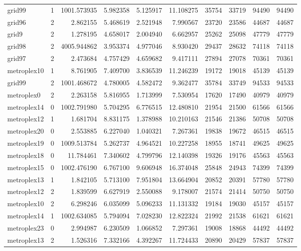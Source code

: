 \begin{longtable}{|l|r|r|r|r|r|r|r|r|r|}
grid99 & 1 & 1001.573935 & 5.982358 & 5.125917 & 11.108275 & 35754 & 33719 & 94490 & 94490 \\
grid96 & 2 & 2.862155 & 5.468619 & 2.521948 & 7.990567 & 23720 & 23586 & 44687 & 44687 \\
grid9 & 2 & 1.278195 & 4.658017 & 2.004940 & 6.662957 & 25262 & 25098 & 47779 & 47779 \\
grid98 & 2 & 4005.944862 & 3.953374 & 4.977046 & 8.930420 & 29437 & 28632 & 74118 & 74118 \\
grid97 & 2 & 2.473684 & 4.757429 & 4.659682 & 9.417111 & 27894 & 27078 & 70361 & 70361 \\
metroplex10 & 1 & 8.761905 & 7.409700 & 3.836539 & 11.246239 & 19172 & 19018 & 45139 & 45139 \\
grid99 & 2 & 1001.468672 & 4.780005 & 4.582472 & 9.362477 & 35784 & 33749 & 94533 & 94533 \\
metroplex0 & 2 & 2.263158 & 5.816955 & 1.713999 & 7.530954 & 17620 & 17490 & 40979 & 40979 \\
metroplex14 & 0 & 1002.791980 & 5.704295 & 6.776515 & 12.480810 & 21954 & 21500 & 61566 & 61566 \\
metroplex12 & 1 & 1.681704 & 8.831175 & 1.378988 & 10.210163 & 21546 & 21386 & 50708 & 50708 \\
metroplex20 & 0 & 2.553885 & 6.227040 & 1.040321 & 7.267361 & 19838 & 19672 & 46515 & 46515 \\
metroplex19 & 0 & 1009.513784 & 5.262737 & 4.964521 & 10.227258 & 18955 & 18741 & 49625 & 49625 \\
metroplex18 & 0 & 11.784461 & 7.340602 & 4.799796 & 12.140398 & 19326 & 19176 & 45563 & 45563 \\
metroplex15 & 0 & 1002.476190 & 6.767100 & 9.606948 & 16.374048 & 25848 & 24943 & 74399 & 74399 \\
metroplex13 & 1 & 1.842105 & 5.713100 & 7.951804 & 13.664904 & 20852 & 20391 & 57780 & 57780 \\
metroplex12 & 2 & 1.839599 & 6.627919 & 2.550088 & 9.178007 & 21574 & 21414 & 50750 & 50750 \\
metroplex10 & 2 & 6.298246 & 6.035099 & 5.096233 & 11.131332 & 19184 & 19030 & 45157 & 45157 \\
metroplex14 & 1 & 1002.634085 & 5.794094 & 7.028230 & 12.822324 & 21992 & 21538 & 61621 & 61621 \\
metroplex23 & 0 & 2.994987 & 6.230509 & 1.066852 & 7.297361 & 19008 & 18868 & 44492 & 44492 \\
metroplex13 & 2 & 1.526316 & 7.332166 & 4.392267 & 11.724433 & 20890 & 20429 & 57837 & 57837 \\

\end{longtable}
